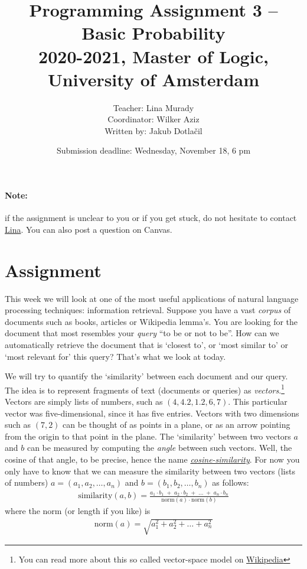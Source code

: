 \documentclass[11pt, a4paper]{article}
\title{Programming Assignment 3 -- Basic Probability \\[2mm]
\large{2020-2021, Master of Logic, University of Amsterdam}}
\author{Teacher: Lina Murady \\
  Coordinator: Wilker Aziz\\
  Written by: Jakub Dotla\v{c}il}
\date{Submission deadline: Wednesday, November 18, 6 pm}
\begin{document}
\maketitle

\paragraph{Note:} if the assignment is unclear to you or if you get stuck, do not hesitate to contact \href{mailto:l.murady@uva.nl}{Lina}. You can also post a question on Canvas.

\section{Assignment}
This week we will look at one of the most useful applications of natural language processing techniques: information retrieval. 
Suppose you have a vast \emph{corpus} of documents such as books, articles or Wikipedia lemma's.
You are looking for the document that most resembles your \emph{query} ``to be or not to be''. 
How can we automatically retrieve the document that is `closest to', or `most similar to' or `most relevant for' this query?
That's what we look at today.



We will try to quantify the `similarity' between each document and our query. 
The idea is to represent fragments of text (documents or queries) as \emph{vectors}.\footnote{You can read more about this so called vector-space model on \href{https://en.wikipedia.org/wiki/Vector_space_model}{Wikipedia}} 
Vectors are simply lists of numbers, such as $(4, 4.2, 1.2, 6, 7)$. 
This particular vector was five-dimensional, since it has five entries. 
Vectors with two dimensions such as $(7, 2)$ can be thought of as points in a plane, or as an arrow pointing from the origin to that point in the plane.
The `similarity' between two vectors $a$ and $b$ can be measured by computing the \emph{angle} between such vectors. 
Well, the cosine of that angle, to be precise, hence the name \emph{\href{https://en.wikipedia.org/wiki/Cosine_similarity}{cosine-similarity}}. 
For now you only have to know that we can measure the similarity between two vectors (lists of numbers) $a=(a_1, a_2, \dots, a_n)$ and $b = (b_1, b_2, \dots, b_n)$ as follows:
\begin{align}
  \text{similarity}(a, b) 
    = \frac{ a_1 \cdot b_1 \;+\; a_2 \cdot b_2 \;+\; \dots \;+\; a_n \cdot b_n}%
      {\text{norm}(a) \cdot \text{norm}(b)}
\end{align}
where the norm (or length if you like) is
\begin{align}
  \text{norm}(a) = \sqrt{a_1^2 + a_2^2 + \dots + a_n^2}
\end{align}
\end{document}
